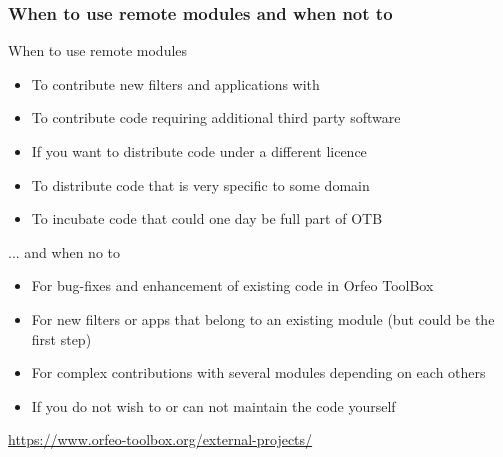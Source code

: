 \documentclass[8pt]{beamer}
\begin{document}
\begin{frame}
\frametitle{When to use remote modules and when not to}

\begin{block}{When to use remote modules}
\begin{itemize}
\item To contribute new filters and applications with
\item To contribute code requiring additional third party software
\item If you want to distribute code under a different licence
\item To distribute code that is very specific to some domain
\item To incubate code that could one day be full part of OTB
\end{itemize}
\end{block}

\begin{block}{... and when no to}
\begin{itemize}
\item For bug-fixes and enhancement of existing code in Orfeo ToolBox
\item For new filters or apps that belong to an existing module (but could be the first step)
\item For complex contributions with several modules depending on each others
\item If you do not wish to or can not maintain the code yourself
\end{itemize}
\end{block}

\begin{center}
\url{https://www.orfeo-toolbox.org/external-projects/}
\end{center}

\end{frame}
\end{document}
